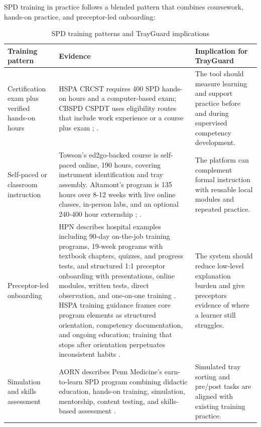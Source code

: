 \documentclass[10pt,a4paper]{article}
\begin{document}
SPD training in practice follows a blended pattern that combines coursework, hands-on practice, and preceptor-led onboarding:
\begin{table}[H]
\centering
\caption{SPD training patterns and TrayGuard implications}
\label{tab:spd-training-patterns-and-trayguard-implications}
\small\renewcommand{\arraystretch}{1.2}\setlength{\tabcolsep}{4pt}
\begin{tabularx}{\textwidth}{|>{\raggedright\arraybackslash}p{3cm}|>{\raggedright\arraybackslash}X|>{\raggedright\arraybackslash}X|}
\hline
Training pattern & Evidence & Implication for TrayGuard \\
\hline
Certification exam plus verified hands-on hours & HSPA CRCST requires 400 SPD hands-on hours and a computer-based exam; CBSPD CSPDT uses eligibility routes that include work experience or a course plus exam \cite{hspa-crcst-accessed-2026}; \cite{cbspd-technician-accessed-2026}. & The tool should measure learning and support practice before and during supervised competency development. \\
\hline
Self-paced or classroom instruction & Towson's ed2go-backed course is self-paced online, 190 hours, covering instrument identification and tray assembly. Altamont's program is 135 hours over 8-12 weeks with live online classes, in-person labs, and an optional 240-400 hour externship \cite{towson-sterile-processing-accessed-2026}; \cite{altamont-healthcare-accessed-2026}. & The platform can complement formal instruction with reusable local modules and repeated practice. \\
\hline
Preceptor-led onboarding & HPN describes hospital examples including 90-day on-the-job training programs, 19-week programs with textbook chapters, quizzes, and progress tests, and structured 1:1 preceptor onboarding with presentations, online modules, written tests, direct observation, and one-on-one training \cite{nadeau-2017}. HSPA training guidance frames core program elements as structured orientation, competency documentation, and ongoing education; training that stops after orientation perpetuates inconsistent habits \cite{klacik-2023}. & The system should reduce low-level explanation burden and give preceptors evidence of where a learner still struggles. \\
\hline
Simulation and skills assessment & AORN describes Penn Medicine's earn-to-learn SPD program combining didactic education, hands-on training, simulation, mentorship, content testing, and skills-based assessment \cite{aorn-staffing-shortage-2025}. & Simulated tray sorting and pre/post tasks are aligned with existing training practice. \\
\hline
\end{tabularx}
\end{table}
\end{document}
